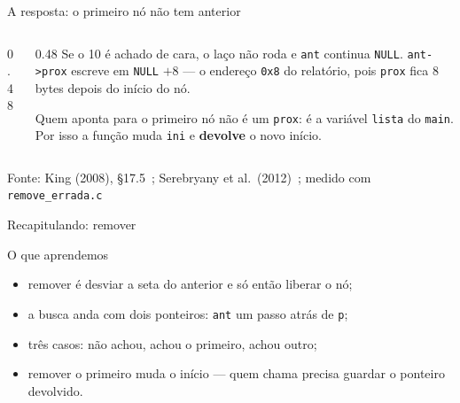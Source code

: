 \documentclass[aspectratio=169]{beamer}
\newcommand{\ptr}[1]{($(#1.one split north)!0.5!(#1.south east)$)}
\newcommand{\fonte}[1]{\vfill\hfill{\scriptsize\textcolor{UFSGray}{Fonte: #1}}}
\begin{document}
\begin{frame}{A resposta: o primeiro nó não tem anterior}
  \begin{columns}[c]
    \begin{column}{0.48\textwidth}
      \begin{center}
      \end{center}
    \end{column}
    \begin{column}{0.48\textwidth}
      \small
      Se o 10 é achado de cara, o laço não roda e \texttt{ant} continua
      \texttt{NULL}. \texttt{ant->prox} escreve em
      \texttt{NULL} $+ 8$ --- o endereço \texttt{0x8} do relatório, pois
      \texttt{prox} fica 8 bytes depois do início do nó.

      \medskip
      Quem aponta para o primeiro nó não é um \texttt{prox}: é a variável
      \texttt{lista} do \texttt{main}. Por isso a função muda \texttt{ini}
      e \textbf{devolve} o novo início.
    \end{column}
  \end{columns}
  \fonte{King (2008), §17.5~\cite{king2008c};
    Serebryany et al.\ (2012)~\cite{serebryany2012asan};
    medido com \texttt{remove\_errada.c}}
\end{frame}

\begin{frame}{Recapitulando: remover}
  \begin{block}{O que aprendemos}
    \begin{itemize}
      \item remover é desviar a seta do anterior e só então liberar o nó;
      \item a busca anda com dois ponteiros: \texttt{ant} um passo atrás de
        \texttt{p};
      \item três casos: não achou, achou o primeiro, achou outro;
      \item remover o primeiro muda o início --- quem chama precisa guardar
        o ponteiro devolvido.
    \end{itemize}
  \end{block}
\end{frame}
\end{document}
